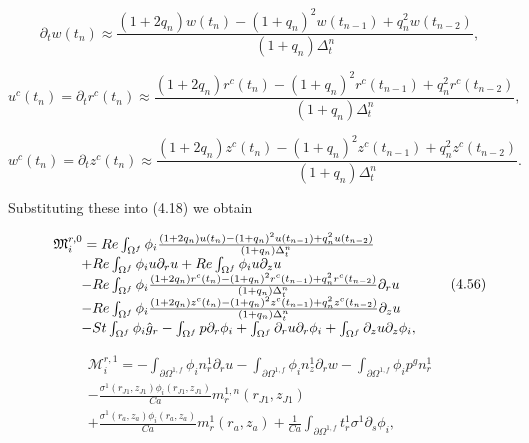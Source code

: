 \documentclass{article}
\begin{document}
\begin{equation}
\partial_t w(t_n) \approx \frac{(1 + 2q_n)w(t_n) - (1 + q_n)^2 w(t_{n-1}) + q_n^2 w(t_{n-2})}{(1 + q_n)\Delta_t^n}, \tag{4.53}
\end{equation}

\begin{equation}
u^c(t_n) = \partial_t r^c(t_n) \approx \frac{(1 + 2q_n)r^c(t_n) - (1 + q_n)^2 r^c(t_{n-1}) + q_n^2 r^c(t_{n-2})}{(1 + q_n)\Delta_t^n}, \tag{4.54}
\end{equation}

\begin{equation}
w^c(t_n) = \partial_t z^c(t_n) \approx \frac{(1 + 2q_n)z^c(t_n) - (1 + q_n)^2 z^c(t_{n-1}) + q_n^2 z^c(t_{n-2})}{(1 + q_n)\Delta_t^n}. \tag{4.55}
\end{equation}

Substituting these into (4.18) we obtain

\begin{equation}
\begin{array}{r l} & \mathfrak{M}_i^{r,0} = Re\int_{\Omega^f}\phi_i\frac{(1 + 2q_n)u(t_n) - (1 + q_n)^2 u(t_{n-1}) + q_n^2 u(t_{n-2})}{(1 + q_n)\Delta_t^n}\\ & \qquad + Re\int_{\Omega^f}\phi_i u\partial_r u + Re\int_{\Omega^f}\phi_i u\partial_z u\\ & \qquad - Re\int_{\Omega^f}\phi_i\frac{(1 + 2q_n)r^c(t_n) - (1 + q_n)^2 r^c(t_{n-1}) + q_n^2 r^c(t_{n-2})}{(1 + q_n)\Delta_t^n}\partial_r u\\ & \qquad - Re\int_{\Omega^f}\phi_i\frac{(1 + 2q_n)z^c(t_n) - (1 + q_n)^2 z^c(t_{n-1}) + q_n^2 z^c(t_{n-2})}{(1 + q_n)\Delta_t^n}\partial_z u\\ & \qquad - St\int_{\Omega^f}\phi_i\hat{g}_r - \int_{\Omega^f}p\partial_r\phi_i + \int_{\Omega^f}\partial_r u\partial_r\phi_i + \int_{\Omega^f}\partial_z u\partial_z\phi_i, \end{array} \tag{4.56}
\end{equation}

\begin{equation}
\begin{array}{l} \mathcal{M}_i^{r,1} = -\int_{\partial \Omega^{1,f}} \phi_i n_r^1 \partial_r u - \int_{\partial \Omega^{1,f}} \phi_i n_z^1 \partial_r w - \int_{\partial \Omega^{1,f}} \phi_i p^g n_r^1 \\ - \frac{\sigma^1(r_{J1},z_{J1})\phi_i(r_{J1},z_{J1})}{Ca} m_r^{1,n}(r_{J1},z_{J1}) \\ + \frac{\sigma^1(r_a,z_a)\phi_i(r_a,z_a)}{Ca} m_r^{1}(r_a,z_a) + \frac{1}{Ca} \int_{\partial \Omega^{1,f}} t_r^1 \sigma^1 \partial_s \phi_i, \end{array} \tag{4.57}
\end{equation}
\end{document}
